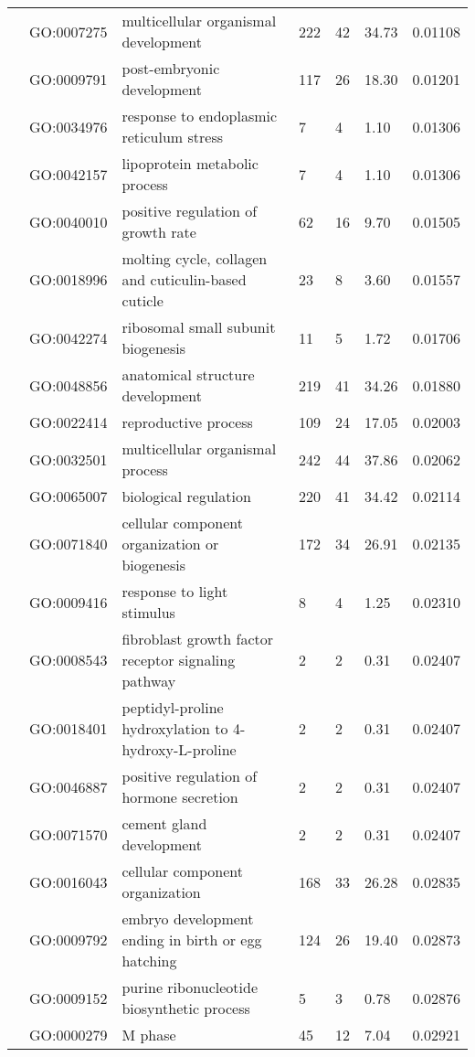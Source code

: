 \documentclass[10pt]{bmc_article}
\newenvironment{bmcformat}{\begin{raggedright}\baselineskip20pt\sloppy\setboolean{publ}{false}}{\end{raggedright}\baselineskip20pt\sloppy}
\begin{document}
\begin{bmcformat}
\begin{longtable}{p{1.7cm}lp{4.5cm}p{1cm}p{1cm}ll}
   & GO:0007275 & multicellular organismal development & 222 &  42 & 34.73 & 0.01108 \\ 
   & GO:0009791 & post-embryonic development & 117 &  26 & 18.30 & 0.01201 \\ 
   & GO:0034976 & response to endoplasmic reticulum stress &   7 &   4 & 1.10 & 0.01306 \\ 
   & GO:0042157 & lipoprotein metabolic process &   7 &   4 & 1.10 & 0.01306 \\ 
   & GO:0040010 & positive regulation of growth rate &  62 &  16 & 9.70 & 0.01505 \\ 
   & GO:0018996 & molting cycle, collagen and cuticulin-based cuticle &  23 &   8 & 3.60 & 0.01557 \\ 
   & GO:0042274 & ribosomal small subunit biogenesis &  11 &   5 & 1.72 & 0.01706 \\ 
   & GO:0048856 & anatomical structure development & 219 &  41 & 34.26 & 0.01880 \\ 
   & GO:0022414 & reproductive process & 109 &  24 & 17.05 & 0.02003 \\ 
   & GO:0032501 & multicellular organismal process & 242 &  44 & 37.86 & 0.02062 \\ 
   & GO:0065007 & biological regulation & 220 &  41 & 34.42 & 0.02114 \\ 
   & GO:0071840 & cellular component organization or biogenesis & 172 &  34 & 26.91 & 0.02135 \\ 
   & GO:0009416 & response to light stimulus &   8 &   4 & 1.25 & 0.02310 \\ 
   & GO:0008543 & fibroblast growth factor receptor signaling pathway &   2 &   2 & 0.31 & 0.02407 \\ 
   & GO:0018401 & peptidyl-proline hydroxylation to 4-hydroxy-L-proline &   2 &   2 & 0.31 & 0.02407 \\ 
   & GO:0046887 & positive regulation of hormone secretion &   2 &   2 & 0.31 & 0.02407 \\ 
   & GO:0071570 & cement gland development &   2 &   2 & 0.31 & 0.02407 \\ 
   & GO:0016043 & cellular component organization & 168 &  33 & 26.28 & 0.02835 \\ 
   & GO:0009792 & embryo development ending in birth or egg hatching & 124 &  26 & 19.40 & 0.02873 \\ 
   & GO:0009152 & purine ribonucleotide biosynthetic process &   5 &   3 & 0.78 & 0.02876 \\ 
   & GO:0000279 & M phase &  45 &  12 & 7.04 & 0.02921 \\ 

\end{longtable}
\end{bmcformat}
\end{document}
